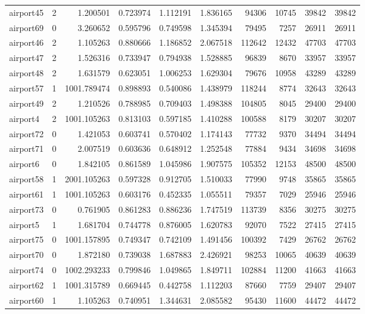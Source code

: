 \begin{longtable}{|l|r|r|r|r|r|r|r|r|r|}
airport45 & 2 & 1.200501 & 0.723974 & 1.112191 & 1.836165 & 94306 & 10745 & 39842 & 39842 \\
airport69 & 0 & 3.260652 & 0.595796 & 0.749598 & 1.345394 & 79495 & 7257 & 26911 & 26911 \\
airport46 & 2 & 1.105263 & 0.880666 & 1.186852 & 2.067518 & 112642 & 12432 & 47703 & 47703 \\
airport47 & 2 & 1.526316 & 0.733947 & 0.794938 & 1.528885 & 96839 & 8670 & 33957 & 33957 \\
airport48 & 2 & 1.631579 & 0.623051 & 1.006253 & 1.629304 & 79676 & 10958 & 43289 & 43289 \\
airport57 & 1 & 1001.789474 & 0.898893 & 0.540086 & 1.438979 & 118244 & 8774 & 32643 & 32643 \\
airport49 & 2 & 1.210526 & 0.788985 & 0.709403 & 1.498388 & 104805 & 8045 & 29400 & 29400 \\
airport4 & 2 & 1001.105263 & 0.813103 & 0.597185 & 1.410288 & 100588 & 8179 & 30207 & 30207 \\
airport72 & 0 & 1.421053 & 0.603741 & 0.570402 & 1.174143 & 77732 & 9370 & 34494 & 34494 \\
airport71 & 0 & 2.007519 & 0.603636 & 0.648912 & 1.252548 & 77884 & 9434 & 34698 & 34698 \\
airport6 & 0 & 1.842105 & 0.861589 & 1.045986 & 1.907575 & 105352 & 12153 & 48500 & 48500 \\
airport58 & 1 & 2001.105263 & 0.597328 & 0.912705 & 1.510033 & 77990 & 9748 & 35865 & 35865 \\
airport61 & 1 & 1001.105263 & 0.603176 & 0.452335 & 1.055511 & 79357 & 7029 & 25946 & 25946 \\
airport73 & 0 & 0.761905 & 0.861283 & 0.886236 & 1.747519 & 113739 & 8356 & 30275 & 30275 \\
airport5 & 1 & 1.681704 & 0.744778 & 0.876005 & 1.620783 & 92070 & 7522 & 27415 & 27415 \\
airport75 & 0 & 1001.157895 & 0.749347 & 0.742109 & 1.491456 & 100392 & 7429 & 26762 & 26762 \\
airport70 & 0 & 1.872180 & 0.739038 & 1.687883 & 2.426921 & 98253 & 10065 & 40639 & 40639 \\
airport74 & 0 & 1002.293233 & 0.799846 & 1.049865 & 1.849711 & 102884 & 11200 & 41663 & 41663 \\
airport62 & 1 & 1001.315789 & 0.669445 & 0.442758 & 1.112203 & 87660 & 7759 & 29407 & 29407 \\
airport60 & 1 & 1.105263 & 0.740951 & 1.344631 & 2.085582 & 95430 & 11600 & 44472 & 44472 \\

\end{longtable}
